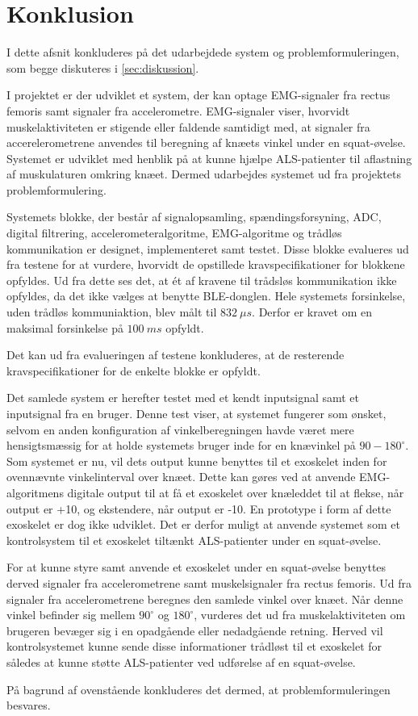 \section{Konklusion}
I dette afsnit konkluderes på det udarbejdede system og problemformuleringen, som begge diskuteres i \autoref{sec:diskussion}. 

I projektet er der udviklet et system, der kan optage EMG-signaler fra rectus femoris samt signaler fra accelerometre. EMG-signaler viser, hvorvidt muskelaktiviteten er stigende eller faldende samtidigt med, at signaler fra accerelerometrene anvendes til beregning af knæets vinkel under en squat-øvelse. Systemet er udviklet med henblik på at kunne hjælpe ALS-patienter til aflastning af muskulaturen omkring knæet. Dermed udarbejdes systemet ud fra projektets problemformulering. 

Systemets blokke, der består af signalopsamling, spændingsforsyning, ADC, digital filtrering, accelerometeralgoritme, EMG-algoritme og trådløs kommunikation er designet, implementeret samt testet. Disse blokke evalueres ud fra testene for at vurdere, hvorvidt de opstillede kravspecifikationer for blokkene opfyldes. Ud fra dette ses det, at ét af kravene til trådsløs kommunikation ikke opfyldes, da det ikke vælges at benytte BLE-donglen.
Hele systemets forsinkelse, uden trådløs kommuniaktion, blev målt til $832~\mu s$. Derfor er kravet om en maksimal forsinkelse på $100~ms$ opfyldt.

Det kan ud fra evalueringen af testene konkluderes, at de resterende kravspecifikationer for de enkelte blokke er opfyldt. 

Det samlede system er herefter testet med et kendt inputsignal samt et inputsignal fra en bruger. Denne test viser, at systemet fungerer som ønsket, selvom en anden konfiguration af vinkelberegningen havde været mere hensigtsmæssig for at holde systemets bruger inde for en knævinkel på $90-180^{\circ}$. Som systemet er nu, vil dets output kunne benyttes til et exoskelet inden for ovennævnte vinkelinterval over knæet. Dette kan gøres ved at anvende EMG-algoritmens digitale output til at få et exoskelet over knæleddet til at flekse, når output er +10, og ekstendere, når output er -10. En prototype i form af dette exoskelet er dog ikke udviklet. Det er derfor muligt at anvende systemet som et kontrolsystem til et exoskelet tiltænkt ALS-patienter under en squat-øvelse.

For at kunne styre samt anvende et exoskelet under en squat-øvelse benyttes derved signaler fra accelerometrene samt muskelsignaler fra rectus femoris. Ud fra signaler fra accelerometrene beregnes den samlede vinkel over knæet. Når denne vinkel befinder sig mellem  $90^{\circ}$ og $180^{\circ}$, vurderes det ud fra muskelaktiviteten om brugeren bevæger sig i en opadgående eller nedadgående retning. Herved vil kontrolsystemet kunne sende disse informationer trådløst til et exoskelet for således at kunne støtte ALS-patienter ved udførelse af en squat-øvelse.

På bagrund af ovenstående konkluderes det dermed, at problemformuleringen besvares. 